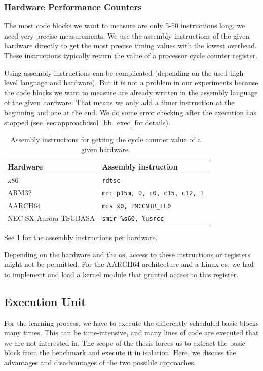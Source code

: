 \subsubsection{Hardware Performance Counters}
\tobechecked
\label{sec:approach:hwpercounter}
The most code blocks we want to measure are only 5-50 instructions long, \ie we need very precise measurements.
We use the assembly instructions of the given hardware directly to get the most precise timing values with the lowest overhead.
These instructions typically return the value of a processor cycle counter register.

Using assembly instructions can be complicated (depending on the used high-level language and hardware).
But it is not a problem in our experiments because the code blocks we want to measure are already written in the assembly language of the given hardware.
That means we only add a timer instruction at the beginning and one at the end.
We do some error checking after the execution has stopped (see \cref{sec:approach:isol_bb_exec} for details).
\begin{table}
    \centering
    \begin{tabular}{@{}ll@{}}
        \toprule
        Hardware & Assembly instruction \\
        \midrule
        x86 & \lstinline|rdtsc| \\
        ARM32 & \lstinline|mrc p15m, 0, r0, c15, c12, 1| \\
        AARCH64 & \lstinline|mrs x0, PMCCNTR_EL0| \\
        NEC SX-Aurora TSUBASA & \lstinline|smir %s60, %usrcc| \\
        \bottomrule
    \end{tabular}
    \caption{Assembly instructions for getting the cycle counter value of a given hardware.}
    \label{tab:approach:asm_instrs_timing}
\end{table}
See \cref{tab:approach:asm_instrs_timing} for the assembly instructions per hardware.

Depending on the hardware and the \ac{os}, access to these instructions or registers might not be permitted.
For the AARCH64 architecture and a Linux \ac{os}, we had to implement and load a kernel module that granted access to this register.
 

\subsection{Execution Unit}
\label{sec:approach:exec_unit}
For the learning process, we have to execute the differently scheduled basic blocks many times.
This can be time-intensive, and many lines of code are executed that we are not interested in.
The scope of the thesis forces us to extract the basic block from the benchmark and execute it in isolation.
Here, we discuss the advantages and disadvantages of the two possible approaches.

